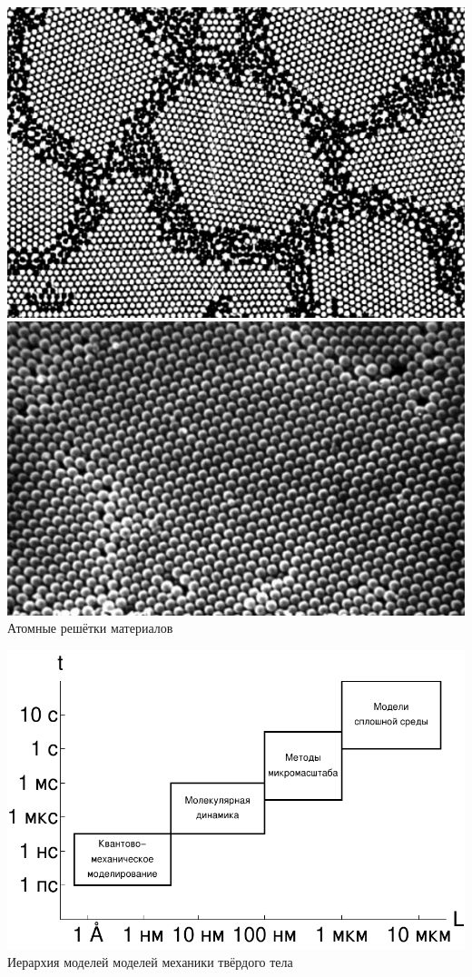\begin{frame}
	\begin{minipage}{0.29\textwidth}
		\includegraphics[width=\linewidth]{pics/Atoms.png} \\
		\medskip
		\includegraphics[width=\linewidth]{pics/Kremnezem.png} \\
		Атомные решётки материалов
	\end{minipage}
	\hfill
	\begin{minipage}{0.69\textwidth}
		\begin{center}
		\includegraphics[width=\textwidth]{pics/ModelsHierarchy.pdf} \\
		Иерархия моделей моделей механики твёрдого тела
		\end{center}
	\end{minipage}
	

\end{frame}
